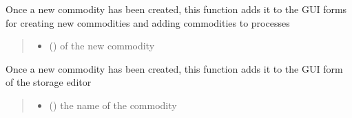 \documentclass[letterpaper,10pt,english]{sphinxmanual}
\begin{document}

\begin{fulllineitems}
\label{\detokenize{docs_gui/js_api/urbs_editor/commodity_editor:addCommToProcessCreationFormList}}
\pysigstartsignatures
{}
\pysigstopsignatures
\sphinxAtStartPar
Once a new commodity has been created, this function adds it to the GUI forms for creating new commodities and adding commodities to processes
\begin{quote}\begin{description}
\begin{itemize}
\item {} 
\sphinxAtStartPar
{} () \textendash{} of the new commodity

\end{itemize}

\end{description}\end{quote}

\end{fulllineitems}


\begin{fulllineitems}
\label{\detokenize{docs_gui/js_api/urbs_editor/commodity_editor:addCommToStorageComList}}
\pysigstartsignatures
{}
\pysigstopsignatures
\sphinxAtStartPar
Once a new commodity has been created, this function adds it to the GUI form of the storage editor
\begin{quote}\begin{description}
\begin{itemize}
\item {} 
\sphinxAtStartPar
{} () \textendash{} the name of the commodity

\end{itemize}

\end{description}\end{quote}

\end{fulllineitems}
\end{document}
